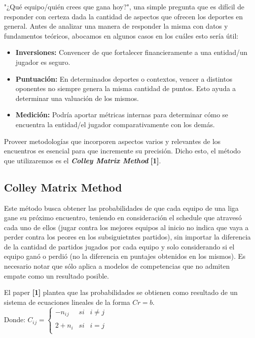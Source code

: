 "¿Qu\'e equipo/qui\'en crees que gana hoy?", una simple pregunta que es dif\'icil de responder con certeza dada la cantidad de aspectos que ofrecen los deportes en general. Antes de analizar una manera de responder la misma con datos y fundamentos te\'oricos, abocamos en algunos casos en los cuáles esto ser\'ia \'util:

\begin{itemize}
\item \textbf{Inversiones:} Convencer de que fortalecer financieramente a una entidad/un jugador es seguro.
\item \textbf{Puntuaci\'on:} En determinados deportes o contextos, vencer a distintos oponentes no siempre genera la misma cantidad de puntos. Esto ayuda a determinar una valuaci\'on de los mismos.
\item \textbf{Medici\'on:} Podr\'ia aportar m\'etricas internas para determinar c\'omo se encuentra la entidad/el jugador comparativamente con los dem\'as.
\end{itemize}

Proveer metodolog\'ias que incorporen aspectos varios y relevantes de los encuentros es esencial para que incremente su precisión. Dicho esto, el m\'etodo que utilizaremos es el \textbf{\textit{Colley Matrix Method}} \textbf{[1]}.

\subsection{Colley Matrix Method}

Este m\'etodo busca obtener las probabilidades de que cada equipo de una liga gane su pr\'oximo encuentro, teniendo en consideraci\'on el schedule que atraves\'o cada uno de ellos (jugar contra los mejores equipos al inicio no indica que vaya a perder contra los peores en los subsiguietntes partidos), sin importar la diferencia de la cantidad de partidos jugados por cada equipo y solo considerando si el equipo gan\'o o perdi\'o (no la diferencia en puntajes obtenidos en los mismos). Es necesario notar que s\'olo aplica a modelos de competencias que no admiten empate como un resultado posible.

El paper \textbf{[1]} plantea que las probabilidades se obtienen como resultado de un sistema de ecuaciones lineales de la forma $Cr = b$. \\

Donde: 
$C{_i}{_j} =
\left\{
	\begin{array}{lcc}
		-n{_i}{_j} & si & i \neq j \\
		\\ 2 + n{_i} & si & i = j \\
	\end{array}
\right.$ \\

